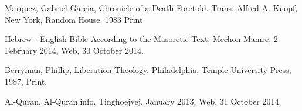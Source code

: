 \documentclass[11pt,a4wide]{article}
\begin{document}
\begin{thebibliography}{99}

Marquez, Gabriel Garcia,
Chronicle of a Death Foretold.
Trans. Alfred A. Knopf,
New York,
Random House, 1983
Print.

Hebrew - English Bible According to the Masoretic Text,
Mechon Mamre,
2 February 2014,
Web,
30 October 2014.

Berryman, Phillip,
Liberation Theology,
Philadelphia,
Temple University Press,
1987,
Print.

Al-Quran,
Al-Quran.info.
Tinghoejvej,
January 2013,
Web,
31 October 2014.


\end{thebibliography}
\end{document}
